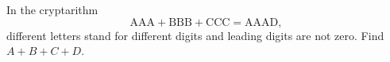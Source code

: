 In the cryptarithm
\[\text{AAA}+\text{BBB}+\text{CCC}=\text{AAAD},\]
different letters stand for different digits and leading digits are not zero. Find $A+B+C+D$.
